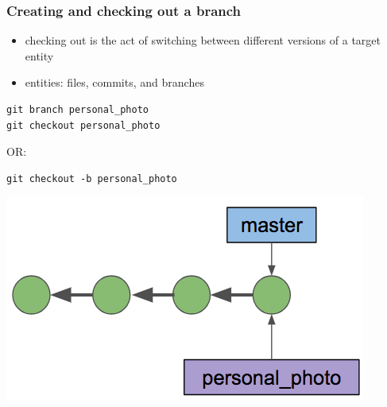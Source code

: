 \documentclass[12pt]{beamer}
\begin{document}
\begin{frame}[fragile]
\frametitle{Creating and checking out a branch}
\begin{itemize}
	\item checking out is the act of switching between different versions of a target entity
	\item entities: files, commits, and branches
\end{itemize}
\begin{verbatim}
git branch personal_photo
git checkout personal_photo
\end{verbatim}
OR:
\begin{verbatim}
git checkout -b personal_photo
\end{verbatim}
\begin{center}
	\includegraphics[width=0.55\linewidth]{branch_diagram}
\end{center}
\end{frame}
\end{document}
